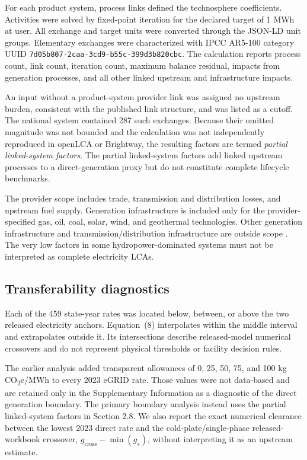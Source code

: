 \documentclass[review,a4paper,fleqn]{cas-sc}
\newcommand{\cotwoe}{CO\textsubscript{2}e}
\begin{document}
For each product system, process links defined the technosphere coefficients. Activities were solved by fixed-point iteration for the declared target of 1 MWh at user. All exchange and target units were converted through the JSON-LD unit groups. Elementary exchanges were characterized with IPCC AR5-100 category UUID \texttt{7d05b807-2caa-3cd9-b55c-399d3b820cbc}. The calculation reports process count, link count, iteration count, maximum balance residual, impacts from generation processes, and all other linked upstream and infrastructure impacts.

An input without a product-system provider link was assigned no upstream burden, consistent with the published link structure, and was listed as a cutoff. The national system contained 287 such exchanges. Because their omitted magnitude was not bounded and the calculation was not independently reproduced in openLCA or Brightway, the resulting factors are termed \textit{partial linked-system factors}. The partial linked-system factors add linked upstream processes to a direct-generation proxy but do not constitute complete lifecycle benchmarks.

The provider scope includes trade, transmission and distribution losses, and upstream fuel supply. Generation infrastructure is included only for the provider-specified gas, oil, coal, solar, wind, and geothermal technologies. Other generation infrastructure and transmission/distribution infrastructure are outside scope \cite{ref42}. The very low factors in some hydropower-dominated systems must not be interpreted as complete electricity LCAs.

\subsection{Transferability diagnostics}
Each of the 459 state-year rates was located below, between, or above the two released electricity anchors. Equation~(8) interpolates within the middle interval and extrapolates outside it. Its intersections describe released-model numerical crossovers and do not represent physical thresholds or facility decision rules.

The earlier analysis added transparent allowances of 0, 25, 50, 75, and 100 kg \cotwoe{}/MWh to every 2023 eGRID rate. Those values were not data-based and are retained only in the Supplementary Information as a diagnostic of the direct generation boundary. The primary boundary analysis instead uses the partial linked-system factors in Section 2.8. We also report the exact numerical clearance between the lowest 2023 direct rate and the cold-plate/single-phase released-workbook crossover, $g_\mathrm{cross}\mathbin{-}\min(g_s)$, without interpreting it as an upstream estimate.
\end{document}
